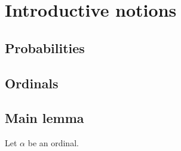 \documentclass[a4paper
,draft
]{article}
\begin{document}

\section{Introductive notions}

\subsection{Probabilities}

\subsection{Ordinals}

\subsection{Main lemma}

Let $\alpha$ be an ordinal.
\end{document}
